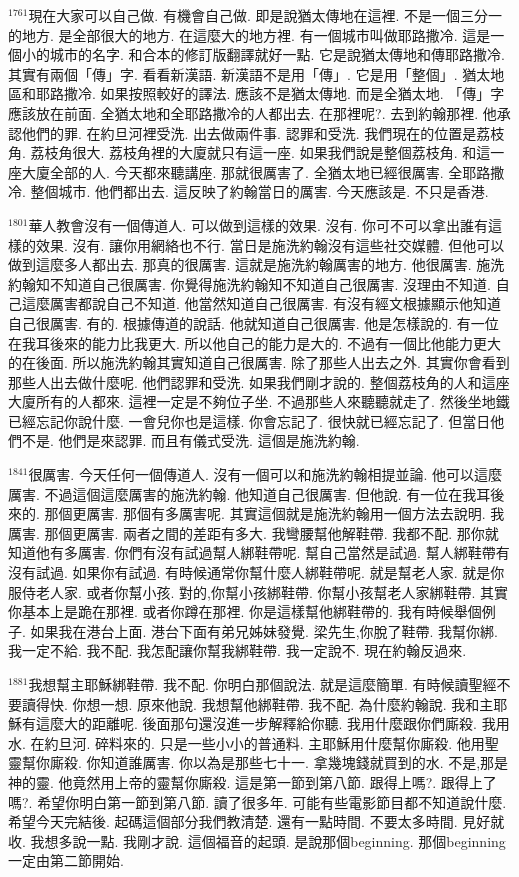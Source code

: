 \documentclass{book}
\begin{document}
$^{1761}$現在大家可以自己做.
有機會自己做.
即是說猶太傳地在這裡.
不是一個三分一的地方.
是全部很大的地方.
在這麼大的地方裡.
有一個城市叫做耶路撒冷.
這是一個小的城市的名字.
和合本的修訂版翻譯就好一點.
它是說猶太傳地和傳耶路撒冷.
其實有兩個「傳」字.
看看新漢語.
新漢語不是用「傳」.
它是用「整個」.
猶太地區和耶路撒冷.
如果按照較好的譯法.
應該不是猶太傳地.
而是全猶太地.
「傳」字應該放在前面.
全猶太地和全耶路撒冷的人都出去.
在那裡呢?.
去到約翰那裡.
他承認他們的罪.
在約旦河裡受洗.
出去做兩件事.
認罪和受洗.
我們現在的位置是荔枝角.
荔枝角很大.
荔枝角裡的大廈就只有這一座.
如果我們說是整個荔枝角.
和這一座大廈全部的人.
今天都來聽講座.
那就很厲害了.
全猶太地已經很厲害.
全耶路撒冷.
整個城市.
他們都出去.
這反映了約翰當日的厲害.
今天應該是.
不只是香港.

$^{1801}$華人教會沒有一個傳道人.
可以做到這樣的效果.
沒有.
你可不可以拿出誰有這樣的效果.
沒有.
讓你用網絡也不行.
當日是施洗約翰沒有這些社交媒體.
但他可以做到這麼多人都出去.
那真的很厲害.
這就是施洗約翰厲害的地方.
他很厲害.
施洗約翰知不知道自己很厲害.
你覺得施洗約翰知不知道自己很厲害.
沒理由不知道.
自己這麼厲害都說自己不知道.
他當然知道自己很厲害.
有沒有經文根據顯示他知道自己很厲害.
有的.
根據傳道的說話.
他就知道自己很厲害.
他是怎樣說的.
有一位在我耳後來的能力比我更大.
所以他自己的能力是大的.
不過有一個比他能力更大的在後面.
所以施洗約翰其實知道自己很厲害.
除了那些人出去之外.
其實你會看到那些人出去做什麼呢.
他們認罪和受洗.
如果我們剛才說的.
整個荔枝角的人和這座大廈所有的人都來.
這裡一定是不夠位子坐.
不過那些人來聽聽就走了.
然後坐地鐵已經忘記你說什麼.
一會兒你也是這樣.
你會忘記了.
很快就已經忘記了.
但當日他們不是.
他們是來認罪.
而且有儀式受洗.
這個是施洗約翰.

$^{1841}$很厲害.
今天任何一個傳道人.
沒有一個可以和施洗約翰相提並論.
他可以這麼厲害.
不過這個這麼厲害的施洗約翰.
他知道自己很厲害.
但他說.
有一位在我耳後來的.
那個更厲害.
那個有多厲害呢.
其實這個就是施洗約翰用一個方法去說明.
我厲害.
那個更厲害.
兩者之間的差距有多大.
我彎腰幫他解鞋帶.
我都不配.
那你就知道他有多厲害.
你們有沒有試過幫人綁鞋帶呢.
幫自己當然是試過.
幫人綁鞋帶有沒有試過.
如果你有試過.
有時候通常你幫什麼人綁鞋帶呢.
就是幫老人家.
就是你服侍老人家.
或者你幫小孩.
對的,你幫小孩綁鞋帶.
你幫小孩幫老人家綁鞋帶.
其實你基本上是跪在那裡.
或者你蹲在那裡.
你是這樣幫他綁鞋帶的.
我有時候舉個例子.
如果我在港台上面.
港台下面有弟兄姊妹發覺.
梁先生,你脫了鞋帶.
我幫你綁.
我一定不給.
我不配.
我怎配讓你幫我綁鞋帶.
我一定說不.
現在約翰反過來.

$^{1881}$我想幫主耶穌綁鞋帶.
我不配.
你明白那個說法.
就是這麼簡單.
有時候讀聖經不要讀得快.
你想一想.
原來他說.
我想幫他綁鞋帶.
我不配.
為什麼約翰說.
我和主耶穌有這麼大的距離呢.
後面那句還沒進一步解釋給你聽.
我用什麼跟你們廝殺.
我用水.
在約旦河.
碎料來的.
只是一些小小的普通料.
主耶穌用什麼幫你廝殺.
他用聖靈幫你廝殺.
你知道誰厲害.
你以為是那些七十一.
拿幾塊錢就買到的水.
不是,那是神的靈.
他竟然用上帝的靈幫你廝殺.
這是第一節到第八節.
跟得上嗎?.
跟得上了嗎?.
希望你明白第一節到第八節.
讀了很多年.
可能有些電影節目都不知道說什麼.
希望今天完結後.
起碼這個部分我們教清楚.
還有一點時間.
不要太多時間.
見好就收.
我想多說一點.
我剛才說.
這個福音的起頭.
是說那個beginning.
那個beginning一定由第二節開始.
\end{document}
